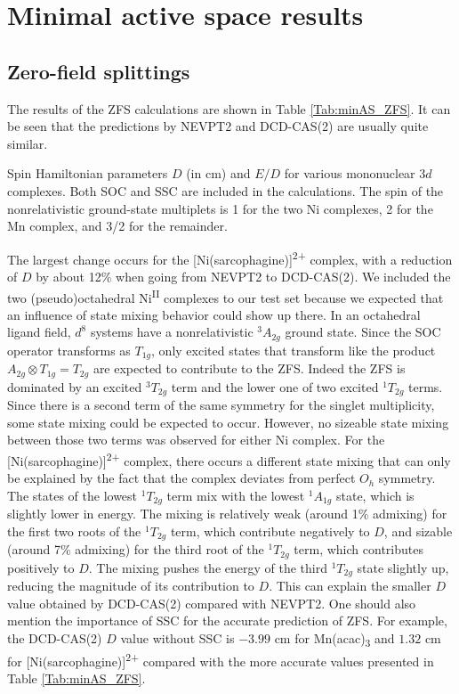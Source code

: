 \section{Minimal active space results}
\subsection{Zero-field splittings}
The results of the ZFS calculations are shown in Table \ref{Tab:minAS_ZFS}. It can be seen that the predictions by NEVPT2 and DCD-CAS(2) are usually quite similar. 
\begin{table}
\small
\centering
\ttabbox
{\caption[Spin Hamiltonian parameters $D$ and $E/D$ for various mononuclear $3d$ complexes.]{Spin Hamiltonian parameters $D$ (in cm\textsuperscript{}) and $E/D$  for various mononuclear $3d$ complexes. Both SOC and SSC are included in the calculations. The spin of the nonrelativistic ground-state multiplets is 1 for the two Ni complexes, 2 for the Mn complex, and 3/2 for the remainder.}
\label{Tab:minAS_ZFS}}
{
}
\end{table}
The largest change occurs for the [Ni(sarcophagine)]\textsuperscript{2+} complex, with a reduction of $D$ by about 12\% when going from NEVPT2 to DCD-CAS(2). We included the two (pseudo)octahedral Ni\textsuperscript{II} complexes to our test set because we expected that an influence of state mixing behavior could show up there. In an octahedral ligand field, $d^8$ systems have a nonrelativistic $^3A_{2g}$ ground state. Since the SOC operator transforms as $T_{1g}$, only excited states that transform like the product ${A_{2g}} \otimes {T_{1g}} = {T_{2g}}$ are expected to contribute to the ZFS. Indeed the ZFS is dominated by an excited $^3T_{2g}$ term and the lower one of two excited $^1T_{2g}$ terms. Since there is a second term of the same symmetry for the singlet multiplicity, some state mixing could be expected to occur. However, no sizeable state mixing between those two terms was observed for either Ni complex. For the [Ni(sarcophagine)]\textsuperscript{2+} complex, there occurs a different state mixing that can only be explained by the fact that the complex deviates from perfect $O_h$ symmetry. The states of the lowest $^1T_{2g}$ term mix with the lowest $^1A_{1g}$ state, which is slightly lower in energy. The mixing is relatively weak (around 1\% admixing) for the first two roots of the $^1T_{2g}$ term, which contribute negatively to $D$, and sizable (around 7\% admixing) for the third root of the $^1T_{2g}$ term, which contributes positively to $D$. The mixing pushes the energy of the third $^1T_{2g}$ state slightly up, reducing the magnitude of its contribution to $D$. This can explain the smaller $D$ value obtained by DCD-CAS(2) compared with NEVPT2. One should also mention the importance of SSC for the accurate prediction of ZFS. For example, the DCD-CAS(2) $D$ value without SSC is $-3.99$ cm\textsuperscript{} for Mn(acac)\textsubscript{3} and $1.32$ cm\textsuperscript{} for [Ni(sarcophagine)]\textsuperscript{2+} compared with the more accurate values presented in Table \ref{Tab:minAS_ZFS}.

